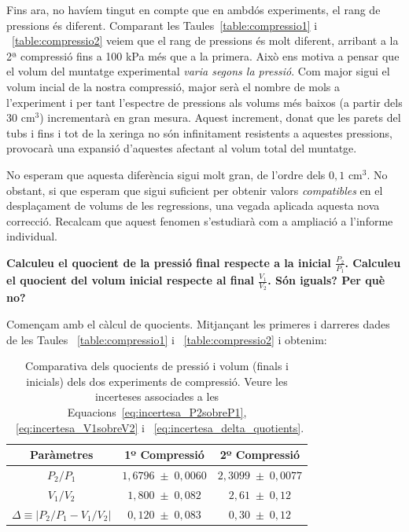 \documentclass[a4paper,twoside,12pt]{article}
\theoremstyle{definition}
\begin{document}
	
	Fins ara, no havíem tingut en compte que en ambdós experiments, el rang de pressions és diferent. Comparant les Taules~\ref{table:compressio1} i ~\ref{table:compressio2} veiem que el rang de pressions és molt diferent, arribant a la 2ª compressió fins a 100 kPa més que a la primera. Això ens motiva a pensar que el volum del muntatge experimental \textit{varia segons la pressió}. Com major sigui el volum incial de la nostra compressió, major serà el nombre de mols a l'experiment i per tant l'espectre de pressions als volums més baixos (a partir dels 30 cm$^3$) incrementarà en gran mesura. Aquest increment, donat que les parets del tubs i fins i tot de la xeringa no són infinitament resistents a aquestes pressions, provocarà una expansió d'aquestes afectant al volum total del muntatge. 
	
	No esperam que aquesta diferència sigui molt gran, de l'ordre dels $0,1$ cm$^3$. No obstant, si que esperam que sigui suficient per obtenir valors \textit{compatibles} en el desplaçament de volums de les regressions, una vegada aplicada aquesta nova correcció. Recalcam que aquest fenomen s'estudiarà com a ampliació a l'informe individual.
	
	\textbf{Calculeu el quocient de la pressió final respecte a la inicial $\frac{P_2}{P_1}$. Calculeu el quocient
		del volum inicial respecte al final $\frac{V_1}{V_2}$. Són iguals? Per què no?}
	
	Començam amb el càlcul de quocients. Mitjançant les primeres i darreres dades de les Taules ~\ref{table:compressio1} i ~\ref{table:compressio2} i obtenim:
	
	\begin{table}[h!]
		\centering
		\caption{Comparativa dels quocients de pressió i volum (finals i inicials) dels dos experiments de compressió. Veure les incerteses associades a les Equacions~\ref{eq:incertesa_P2sobreP1}, ~\ref{eq:incertesa_V1sobreV2} i ~\ref{eq:incertesa_delta_quotients}.}
		\begin{tabular}{|c|c|c|}
			\hline
			Paràmetres & 1º Compressió & 2º Compressió \\
			\hline
			$P_2/P_1$ 
			& $1,6796 \;\pm\; 0,0060$
			& $2,3099 \;\pm\; 0,0077$ \\
			$V_1/V_2$ 
			& $1,800 \;\pm\; 0,082$
			& $2,61 \;\pm\; 0,12$ \\
			$\Delta \equiv |P_2/P_1 - V_1/V_2|$
			& $0,120 \;\pm\; 0,083$
			& $0,30 \;\pm\; 0,12$ \\
			\hline
		\end{tabular}
		\label{table:ratio_checks_s1s2}
	\end{table}
	
\end{document}
